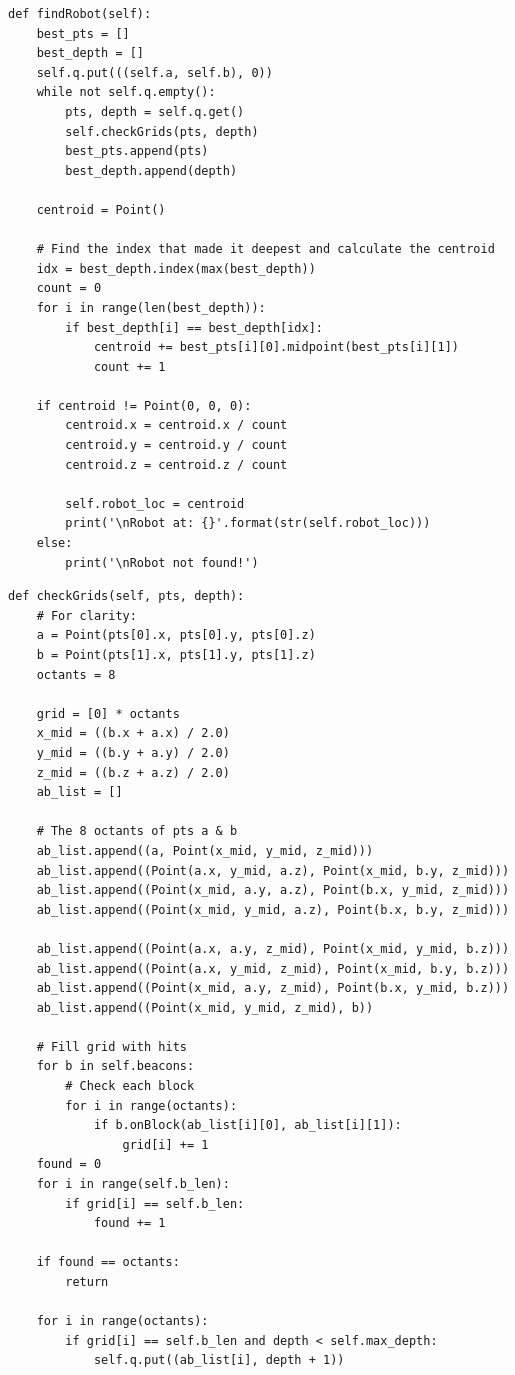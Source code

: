 \documentclass{article}
\begin{document}
\newpage
\begin{verbatim}
def findRobot(self):
    best_pts = []
    best_depth = []
    self.q.put(((self.a, self.b), 0))
    while not self.q.empty():
        pts, depth = self.q.get()
        self.checkGrids(pts, depth)
        best_pts.append(pts)
        best_depth.append(depth)

    centroid = Point()

    # Find the index that made it deepest and calculate the centroid
    idx = best_depth.index(max(best_depth))
    count = 0
    for i in range(len(best_depth)):
        if best_depth[i] == best_depth[idx]:
            centroid += best_pts[i][0].midpoint(best_pts[i][1])
            count += 1

    if centroid != Point(0, 0, 0):
        centroid.x = centroid.x / count
        centroid.y = centroid.y / count
        centroid.z = centroid.z / count

        self.robot_loc = centroid
        print('\nRobot at: {}'.format(str(self.robot_loc)))
    else:
        print('\nRobot not found!')
\end{verbatim}

\newpage
\begin{verbatim}
def checkGrids(self, pts, depth):
    # For clarity:
    a = Point(pts[0].x, pts[0].y, pts[0].z)
    b = Point(pts[1].x, pts[1].y, pts[1].z)
    octants = 8

    grid = [0] * octants
    x_mid = ((b.x + a.x) / 2.0)
    y_mid = ((b.y + a.y) / 2.0)
    z_mid = ((b.z + a.z) / 2.0)
    ab_list = []

    # The 8 octants of pts a & b
    ab_list.append((a, Point(x_mid, y_mid, z_mid)))
    ab_list.append((Point(a.x, y_mid, a.z), Point(x_mid, b.y, z_mid)))
    ab_list.append((Point(x_mid, a.y, a.z), Point(b.x, y_mid, z_mid)))
    ab_list.append((Point(x_mid, y_mid, a.z), Point(b.x, b.y, z_mid)))

    ab_list.append((Point(a.x, a.y, z_mid), Point(x_mid, y_mid, b.z)))
    ab_list.append((Point(a.x, y_mid, z_mid), Point(x_mid, b.y, b.z)))
    ab_list.append((Point(x_mid, a.y, z_mid), Point(b.x, y_mid, b.z)))
    ab_list.append((Point(x_mid, y_mid, z_mid), b))

    # Fill grid with hits
    for b in self.beacons:
        # Check each block
        for i in range(octants):
            if b.onBlock(ab_list[i][0], ab_list[i][1]):
                grid[i] += 1
    found = 0
    for i in range(self.b_len):
        if grid[i] == self.b_len:
            found += 1

    if found == octants:
        return

    for i in range(octants):
        if grid[i] == self.b_len and depth < self.max_depth:
            self.q.put((ab_list[i], depth + 1))
\end{verbatim}
\end{document}
